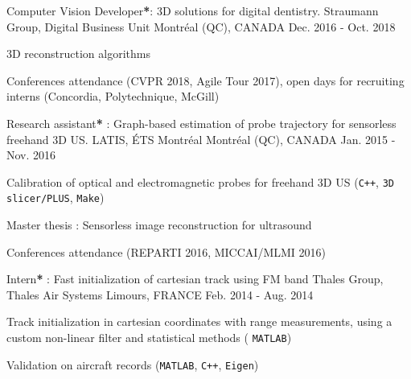 \begin{cventries}

\cventry
{Computer Vision Developer\textbf{*}: 3D solutions for digital dentistry.}%
{Straumann Group, Digital Business Unit} %
{\hspace{-5mm}Montréal (QC), CANADA} %
{Dec. 2016 - Oct. 2018} %
{ %
\begin{cvitems}
\item {3D reconstruction algorithms}
\item {Conferences attendance (CVPR 2018, Agile Tour 2017), open days for recruiting interns (Concordia, Polytechnique, McGill)}
\end{cvitems}
}


\cventry
{Research assistant\textbf{*} : Graph-based estimation of probe trajectory for sensorless freehand 3D US.}%
{LATIS, ÉTS Montréal} %
{\hspace{-5mm}Montréal (QC), CANADA} %
{Jan. 2015 - Nov. 2016} %
{ %
\begin{cvitems}
\item {Calibration of optical and electromagnetic probes for freehand 3D US (\texttt{C++}, \texttt{3D slicer/PLUS}, \texttt{Make})}
\item {Master thesis \cite{tetrel2016estimation}: Sensorless image reconstruction for ultrasound}
\item {Conferences attendance (REPARTI 2016, MICCAI/MLMI 2016)}
\end{cvitems}
}


\cventry
{Intern\textbf{*} : Fast initialization of cartesian track using FM band} %
{Thales Group, Thales Air Systems} %
{Limours, FRANCE} %
{Feb. 2014 - Aug. 2014} %
{ %
\begin{cvitems}
\item {Track initialization in cartesian coordinates with range measurements, using a custom non-linear filter and statistical methods ( \texttt{MATLAB})}
\item {Validation on aircraft records (\texttt{MATLAB}, \texttt{C++}, \texttt{Eigen})}
\end{cvitems}
}
\end{cventries}
